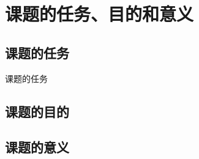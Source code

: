 \section{课题的任务、目的和意义}

\subsection{课题的任务}

\begin{frame}
    课题的任务
\end{frame}

\subsection{课题的目的}

\subsection{课题的意义}
